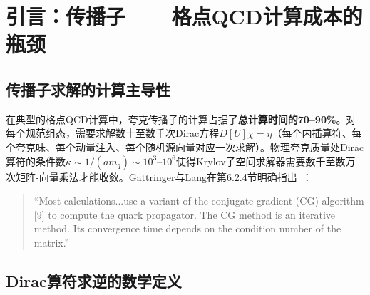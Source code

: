 \documentclass[12pt,a4paper]{ctexart}
\theoremstyle{definition}
\begin{document}
\begin{abstract}
\textbf{第四层——预条件子与高级求解技术（§5）：}
阐述四类预条件技术的原理与应用：\textbf{奇数-偶数预条件}（even-odd preconditioning, 将Dirac算符分解为偶数/奇数子格点上的$2\times2$块矩阵——在Wilson费米子上将条件数减半）；\textbf{代数多重网格}（Algebraic Multigrid, AMG, 通过粗化-平滑循环在不同尺度上消除误差分量——对格点Dirac算符的低模收敛加速有显著效果）；\textbf{本征模缩减}（eigenmode deflation, 显式计算并投射掉最慢收敛的低模——将这些``困难本征值''在CG开始前从算符中移除）；\textbf{域墙/Overlap预条件子}（Domain-Wall/Overlap fermions的五维和精确手征算符的专用预条件技术）。

\textbf{第五层——蒸馏方法：传播子求解与强子谱学的融合（§6）：}
以本库中的蒸馏方法原始文献~\cite{Distillation2009}为实例，详述Laplacian低模本征向量投影如何将全格点大小的传播子问题压缩到数十至数百维的子空间——在保持物理精度的同时大幅降低了计算和存储成本。讨论蒸馏在PDF/DA计算中的拓展应用。
\end{abstract}

\tableofcontents
\newpage

\section{引言：传播子——格点QCD计算成本的瓶颈}

\subsection{传播子求解的计算主导性}

在典型的格点QCD计算中，夸克传播子的计算占据了\textbf{总计算时间的70--90\%}。对每个规范组态，需要求解数十至数千次Dirac方程$D[U] \chi = \eta$（每个内插算符、每个夸克味、每个动量注入、每个随机源向量对应一次求解）。物理夸克质量处Dirac算符的条件数$\kappa \sim 1/(a m_q) \sim 10^3\text{--}10^6$使得Krylov子空间求解器需要数千至数万次矩阵-向量乘法才能收敛。Gattringer与Lang在第6.2.4节明确指出~\cite{GattringerLang2010}：
\begin{quote}
``Most calculations...use a variant of the conjugate gradient (CG) algorithm [9] to compute the quark propagator. The CG method is an iterative method. Its convergence time depends on the condition number of the matrix.''
\end{quote}

\subsection{Dirac算符求逆的数学定义}
\end{document}
